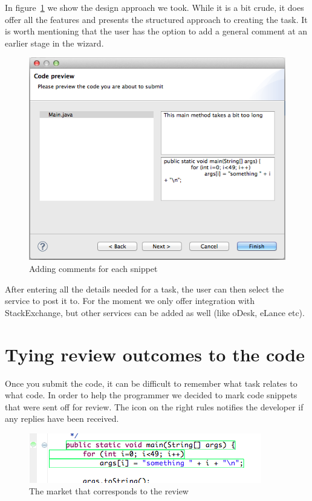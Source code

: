 \documentclass{sigchi}
\begin{document}
In figure~\ref{fig:wizard} we show the design approach we took. While it is a bit crude, it does offer all
the features and presents the structured approach to creating the task. It is worth mentioning that the user
has the option to add a general comment at an earlier stage in the wizard.

\begin{figure}[hbt]
	\includegraphics[width=\columnwidth]{wizard.png}
\caption{Adding comments for each snippet}
\label{fig:wizard}
\end{figure}

After entering all the details needed for a task, the user can then select the service to post it to. For the
moment we only offer integration with StackExchange, but other services can be added as well (like
oDesk, eLance etc). 

\section{Tying review outcomes to the code}

Once you submit the code, it can be difficult to remember what task relates to what code. In order to help
the programmer we decided to mark code snippets that were sent off for review. The icon on the right
rules notifies the developer if any replies have been received. 

\begin{figure}[hbt]
	\includegraphics[width=\columnwidth]{marker.png}
\caption{The market that corresponds to the review}
\label{fig:marker}
\end{figure}
\end{document}

